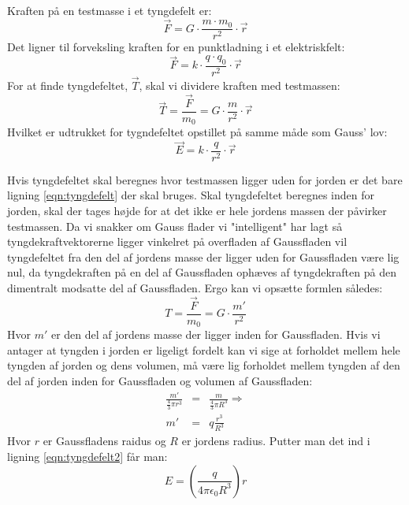 Kraften på en testmasse i et tyngdefelt er:
\begin{equation}
	\vec{F} = G\cdot \frac{m \cdot m_0}{r^2} \cdot \vec{r}
\end{equation}
Det ligner til forveksling kraften for en punktladning i et elektriskfelt:
\begin{equation}
	\vec{F} = k \cdot \frac{q \cdot q_0}{r^2} \cdot \vec{r}
\end{equation}
For at finde tyngdefeltet, $\vec{T}$, skal vi dividere kraften med testmassen:
\begin{equation}
	\label{eqn:tyngdefelt}
	\vec{T} = \frac{\vec{F}}{m_0} = G \cdot \frac{m}{r^2} \cdot \vec{r}
\end{equation}
Hvilket er udtrukket for tygndefeltet opstillet på samme måde som Gauss' lov:
\begin{equation}
	\vec{E} = k \cdot \frac{q}{r^2} \cdot \vec{r}
\end{equation}

Hvis tyngdefeltet skal beregnes hvor testmassen ligger uden for jorden er det bare ligning \ref{eqn:tyngdefelt} der skal bruges.
Skal tyngdefeltet beregnes inden for jorden, skal der tages højde for at det ikke er hele jordens massen der påvirker testmassen. Da vi snakker om Gauss flader vi "intelligent" har lagt så tyngdekraftvektorerne ligger vinkelret på overfladen af Gaussfladen vil tyngdefeltet fra den del af jordens masse der ligger uden for Gaussfladen være lig nul, da tyngdekraften på en del af Gaussfladen ophæves af tyngdekraften på den dimentralt modsatte del af Gaussfladen.
Ergo kan vi opsætte formlen således:
\begin{equation}
	\label{eqn:tyngdefelt2}
	T = \frac{\vec{F}}{m_0} = G \cdot \frac{m'}{r^2}
\end{equation}
Hvor $m'$ er den del af jordens masse der ligger inden for Gaussfladen. Hvis vi antager at tyngden i jorden er ligeligt fordelt kan vi sige at forholdet mellem hele tyngden af jorden og dens volumen, må være lig forholdet mellem tyngden af den del af jorden inden for Gaussfladen og volumen af Gaussfladen:
\begin{eqnarray}
	\frac{m'}{\frac{4}{3}\pi r^3} &=& \frac{m}{\frac{4}{3}\pi R^3} \Rightarrow \nonumber \\
	m' &=& q\frac{r^3}{R^3}
\end{eqnarray}
Hvor $r$ er Gaussfladens raidus og $R$ er jordens radius. Putter man det ind i ligning \ref{eqn:tyngdefelt2} får man:
\begin{equation}
	E = (\frac{q}{4\pi \epsilon _0 R^3})r
\end{equation}
